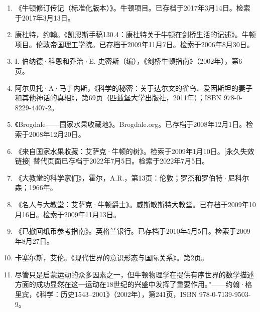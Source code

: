 \begin{enumerate}
\item 《牛顿修订传记（标准化版本）》。牛顿项目。已存档于2017年3月14日。检索于2017年3月13日。  
\item 康杜特，约翰。《凯恩斯手稿130.4：康杜特关于牛顿在剑桥生活的记述》。牛顿项目。伦敦帝国理工学院。已存档于2009年11月7日。检索于2006年8月30日。  
\item I. 伯纳德·科恩和乔治·E. 史密斯（编），《剑桥牛顿指南》（2002年），第6页。  
\item 阿尔贝托·A·马丁内斯，《科学的秘密：关于达尔文的雀鸟、爱因斯坦的妻子和其他神话的真相》，第69页（匹兹堡大学出版社，2011年）；ISBN 978-0-8229-4407-2。  
\item 《Brogdale——国家水果收藏地》。Brogdale.org。已存档于2008年12月1日。检索于2008年12月20日。
\item 《来自国家水果收藏：艾萨克·牛顿的树》。检索于2009年1月10日。[永久失效链接] 替代页面已存档于2022年7月5日。检索于2022年7月5日。  
\item 《大教堂的科学家们》，霍尔，A.R.，第13页：伦敦；罗杰和罗伯特·尼科尔森；1966年。  
\item 《名人与大教堂：艾萨克·牛顿爵士》。威斯敏斯特大教堂。已存档于2009年10月16日。检索于2009年11月13日。  
\item 《已撤回纸币参考指南》。英格兰银行。已存档于2010年5月5日。检索于2009年8月27日。  
\item 卡塞尔斯，艾伦。《现代世界的意识形态与国际关系》。第2页。  
\item 尽管只是启蒙运动的众多因素之一，但牛顿物理学在提供有序世界的数学描述方面的成功显然在这一运动在18世纪的兴盛中发挥了重要作用。”——约翰·格里宾，《科学：历史1543–2001》（2002年），第241页，ISBN 978-0-7139-9503-9。






\end{enumerate}
